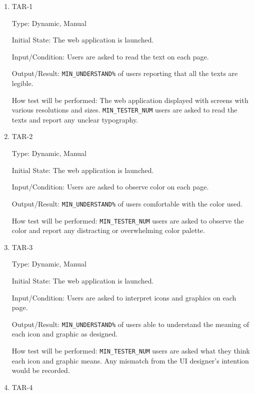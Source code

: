 \documentclass[12pt, titlepage]{article}
\begin{document}
\begin{enumerate}

\item{TAR-1\\}\label{TAR-1}

Type: Dynamic, Manual
					
Initial State: The web application is launched.
					
Input/Condition: Users are asked to read the text on each page.
					
Output/Result: \texttt{MIN\_UNDERSTAND\%} of users reporting that all the texts are legible.
					
How test will be performed: The web application displayed with screens with various resolutions and sizes. \texttt{MIN\_TESTER\_NUM} users are asked to read the texts and report any unclear typography.
					
\item{TAR-2\\}\label{TAR-2}

Type: Dynamic, Manual
					
Initial State: The web application is launched.
					
Input/Condition: Users are asked to observe color on each page.
					
Output/Result: \texttt{MIN\_UNDERSTAND\%} of users comfortable with the color used.
					
How test will be performed: \texttt{MIN\_TESTER\_NUM} users are asked to observe the color and report any distracting or overwhelming color palette.

\item{TAR-3\\}\label{TAR-3}

Type: Dynamic, Manual
					
Initial State: The web application is launched.
					
Input/Condition: Users are asked to interpret icons and graphics on each page.
					
Output/Result: \texttt{MIN\_UNDERSTAND\%} of users able to understand the meaning of each icon and graphic as designed.
					
How test will be performed: \texttt{MIN\_TESTER\_NUM} users are asked what they think each icon and graphic means. Any mismatch from the UI designer's intention would be recorded.

\item{TAR-4\\}\label{TAR-4}


\end{enumerate}
\end{document}
